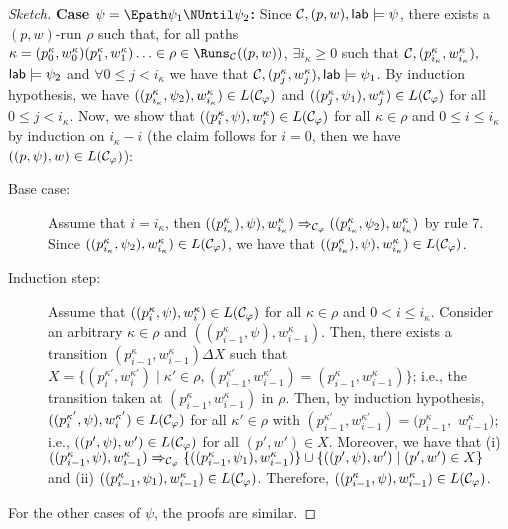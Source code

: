 \documentclass{llncs}
\newcommand{\inductioncase}[1]{\noindent\textbf{#1}}
\let\phi\varphi
\begin{document}
{{\begin{proof}[Sketch]
\inductioncase{Case $\psi = \Epath\psi_1\NUntil\psi_2$:}
Since $\mathcal{C},(p,w),\mathsf{lab} \models \psi$, there exists a $(p,w)$-run $\rho$ such that,
for all paths $\kappa = (p^\kappa_0,w^\kappa_0) (p^\kappa_1,w^\kappa_1) \ldots \in \rho \in \Runs_\CABPDS((p,w))$, 
$\exists i_\kappa \geq 0$ such that $\mathcal{C},(p^\kappa_{i_\kappa},w^\kappa_{i_\kappa}),$ $\mathsf{lab} \models \psi_2$ and
$\forall 0 \leq j < i_\kappa$ we have that $\mathcal{C},(p^\kappa_j,w^\kappa_j),\mathsf{lab} \models \psi_1$. 
By induction hypothesis, we have $((p^\kappa_{i_\kappa},\psi_2),w^\kappa_{i_\kappa}) \in L(\CABPDS_{\phi})$ and
$((p^\kappa_j,\psi_1),w^\kappa_j) \in L(\CABPDS_{\phi})$ for all $0 \leq j < i_\kappa$.
Now, we show that $((p^\kappa_i,\psi),w^\kappa_i) \in L(\CABPDS_\phi)$ for all
$\kappa\in\rho$ and $0 \leq i \leq i_\kappa$ by induction on $i_\kappa-i$ (the claim follows for $i=0$, then we have $((p,\psi),w) \in L(\CABPDS_\phi)$):
\begin{description}
\item [Base case: ] Assume that $i = i_\kappa$, then $((p^\kappa_{i_\kappa}),\psi),w^\kappa_{i_\kappa}) \Rightarrow_{\CABPDS_\phi} ((p^\kappa_{i_\kappa},\psi_2),w^\kappa_{i_\kappa})$ by rule 7. Since 
$((p^\kappa_{i_\kappa},\psi_2),w^\kappa_{i_\kappa}) \in L(\CABPDS_{\phi})$, we have that 
$((p^\kappa_{i_\kappa}),\psi),w^\kappa_{i_\kappa})\in L(\CABPDS_{\phi})$.
\item [Induction step: ] 
Assume that $((p^\kappa_i,\psi),w^\kappa_i) \in L(\CABPDS_\phi)$ for all
$\kappa\in\rho$ and $0 < i \leq i_\kappa$. Consider an arbitrary
$\kappa\in\rho$ and $((p^\kappa_{i-1},\psi),w^\kappa_{i-1})$.
Then, there exists a transition $(p^\kappa_{i-1},w^\kappa_{i-1}) \Delta X$ such that
$X = \{ (p^{\kappa'}_{i},w^{\kappa'}_{i}) \mid \kappa' \in \rho, 
(p^{\kappa'}_{i-1},w^{\kappa'}_{i-1})=(p^\kappa_{i-1},w^\kappa_{i-1}) \}$;
i.e., the transition taken at $(p^\kappa_{i-1},w^\kappa_{i-1})$ in $\rho$.
Then, by induction hypothesis, 
$((p^{\kappa'}_{i},\psi),w^{\kappa'}_{i}) \in L(\CABPDS_\phi)$
for all $\kappa' \in \rho$ with
$(p^{\kappa'}_{i-1},w^{\kappa'}_{i-1})=(p^\kappa_{i-1},$ $w^\kappa_{i-1})$;
i.e., $((p',\psi),w') \in L(\CABPDS_\phi)$ for all $(p',w') \in X$.
Moreover, we have that (i)
$((p^\kappa_{i-1},\psi),w^\kappa_{i-1}) \Rightarrow_{\mathcal{C}_\varphi}
\{ ((p^\kappa_{i-1},\psi_1),w^\kappa_{i-1}) \}
\cup 
\{ ((p',\psi),w') \mid (p',w') \in X \}$ and
(ii) $((p^\kappa_{i-1},\psi_1),w^\kappa_{i-1}) \in L(\CABPDS_\phi)$.
Therefore, $((p^\kappa_{i-1},\psi),w^\kappa_{i-1}) \in L(\CABPDS_\phi)$.
\end{description}
\noindent For the other cases of $\psi$, the proofs are similar.



\end{proof}}}
\end{document}
